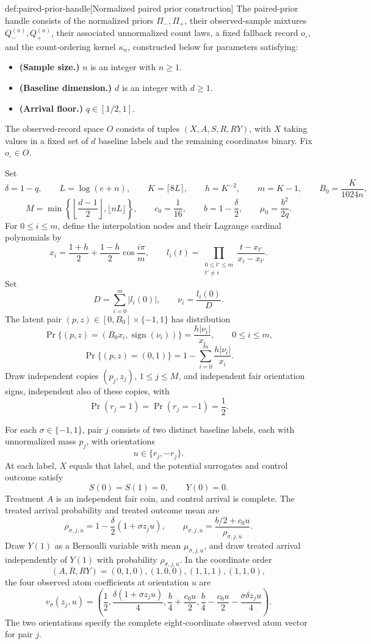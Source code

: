 \begin{definitionv}{def:paired-prior-handle}[Normalized paired prior construction]
The paired-prior handle consists of the normalized priors \(\Pi_-,\Pi_+\), their observed-sample mixtures \(Q_-^{(n)},Q_+^{(n)}\), their associated unnormalized count laws, a fixed fallback record \(o_{\circ}\), and the count-ordering kernel \(\kappa_n\), constructed below for parameters satisfying:
\begin{itemize}
\item \textbf{(Sample size.)} \(n\) is an integer with \(n\ge1\).
\item \textbf{(Baseline dimension.)} \(d\) is an integer with \(d\ge1\).
\item \textbf{(Arrival floor.)} \(q\in[1/2,1]\).
\end{itemize}
The observed-record space \(O\) consists of tuples \((X,A,S,R,RY)\), with \(X\) taking values in a fixed set of \(d\) baseline labels and the remaining coordinates binary. Fix \(o_{\circ}\in O\).

Set
\[
\delta=1-q,\qquad
L=\log(e+n),\qquad
K=\lceil8L\rceil,\qquad
h=K^{-2},\qquad
m=K-1,\qquad
B_0=\frac{K}{1024n},
\]
\[
M=\min\left\{
\left\lfloor\frac{d-1}{2}\right\rfloor,
\lfloor nL\rfloor
\right\},
\qquad
c_0=\frac1{16},\qquad
b=1-\frac{\delta}{2},\qquad
\mu_0=\frac{b^2}{2q}.
\]
For \(0\le i\le m\), define the interpolation nodes and their Lagrange cardinal polynomials by
\[
x_i=\frac{1+h}{2}+\frac{1-h}{2}\cos\frac{i\pi}{m},
\qquad
l_i(t)=\prod_{\substack{0\le t'\le m\\t'\ne i}}
\frac{t-x_{t'}}{x_i-x_{t'}}.
\]
Set
\[
D=\sum_{i=0}^{m}|l_i(0)|,
\qquad
\nu_i=\frac{l_i(0)}{D}.
\]
The latent pair \((p,z)\in[0,B_0]\times\{-1,1\}\) has distribution
\[
\Pr\{(p,z)=(B_0x_i,\operatorname{sign}(\nu_i))\}
=\frac{h|\nu_i|}{x_i},
\qquad 0\le i\le m,
\]
\[
\Pr\{(p,z)=(0,1)\}
=1-\sum_{i=0}^{m}\frac{h|\nu_i|}{x_i}.
\]
Draw independent copies \((p_j,z_j)\), \(1\le j\le M\), and independent fair orientation signs, independent also of these copies, with
\[
\Pr(r_j=1)=\Pr(r_j=-1)=\frac12.
\]

For each \(\sigma\in\{-1,1\}\), pair \(j\) consists of two distinct baseline labels, each with unnormalized mass \(p_j\), with orientations
\[
u\in\{r_j,-r_j\}.
\]
At each label, \(X\) equals that label, and the potential surrogates and control outcome satisfy
\[
S(0)=S(1)=0,\qquad Y(0)=0.
\]
Treatment \(A\) is an independent fair coin, and control arrival is complete. The treated arrival probability and treated outcome mean are
\[
\rho_{\sigma,j,u}
=1-\frac{\delta}{2}(1+\sigma z_ju),
\qquad
\mu_{\sigma,j,u}
=\frac{b/2+c_0u}{\rho_{\sigma,j,u}}.
\]
Draw \(Y(1)\) as a Bernoulli variable with mean \(\mu_{\sigma,j,u}\), and draw treated arrival independently of \(Y(1)\) with probability \(\rho_{\sigma,j,u}\). In the coordinate order
\[
(A,R,RY)=(0,1,0),(1,0,0),(1,1,1),(1,1,0),
\]
the four observed atom coefficients at orientation \(u\) are
\[
v_{\sigma}(z_j,u)
=
\left(
\frac12,
\frac{\delta(1+\sigma z_ju)}4,
\frac b4+\frac{c_0u}{2},
\frac b4-\frac{c_0u}{2}-\frac{\sigma\delta z_ju}{4}
\right).
\]
The two orientations specify the complete eight-coordinate observed atom vector for pair \(j\).


\end{definitionv}
